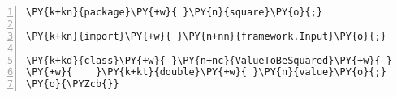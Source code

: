\begin{Verbatim}[commandchars=\\\{\},numbers=left,firstnumber=1,stepnumber=1,frame=single,fontsize=\small]
\PY{k+kn}{package}\PY{+w}{ }\PY{n}{square}\PY{o}{;}

\PY{k+kn}{import}\PY{+w}{ }\PY{n+nn}{framework.Input}\PY{o}{;}

\PY{k+kd}{class}\PY{+w}{ }\PY{n+nc}{ValueToBeSquared}\PY{+w}{ }\PY{k+kd}{implements}\PY{+w}{ }\PY{n}{Input}\PY{+w}{ }\PY{o}{\PYZob{}}
\PY{+w}{    }\PY{k+kt}{double}\PY{+w}{ }\PY{n}{value}\PY{o}{;}
\PY{o}{\PYZcb{}}
\end{Verbatim}
